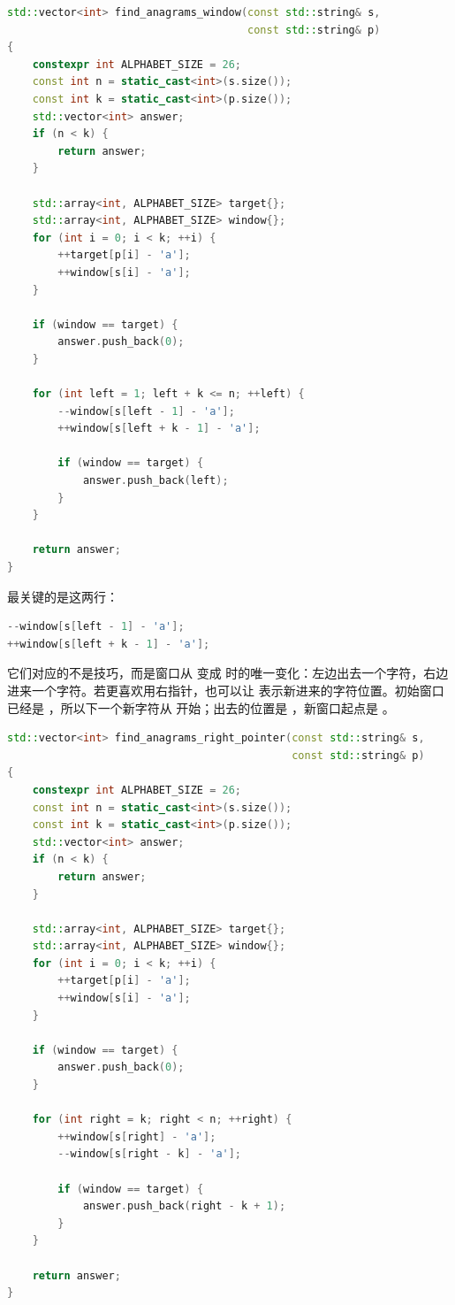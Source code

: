 \begin{lstlisting}[language=C++,caption={LeetCode 438 找到所有字母异位词：数组频次版}]
std::vector<int> find_anagrams_window(const std::string& s,
                                      const std::string& p)
{
    constexpr int ALPHABET_SIZE = 26;
    const int n = static_cast<int>(s.size());
    const int k = static_cast<int>(p.size());
    std::vector<int> answer;
    if (n < k) {
        return answer;
    }

    std::array<int, ALPHABET_SIZE> target{};
    std::array<int, ALPHABET_SIZE> window{};
    for (int i = 0; i < k; ++i) {
        ++target[p[i] - 'a'];
        ++window[s[i] - 'a'];
    }

    if (window == target) {
        answer.push_back(0);
    }

    for (int left = 1; left + k <= n; ++left) {
        --window[s[left - 1] - 'a'];
        ++window[s[left + k - 1] - 'a'];

        if (window == target) {
            answer.push_back(left);
        }
    }

    return answer;
}
\end{lstlisting}

最关键的是这两行：

\begin{lstlisting}[language=C++]
--window[s[left - 1] - 'a'];
++window[s[left + k - 1] - 'a'];
\end{lstlisting}

它们对应的不是技巧，而是窗口从  变成  时的唯一变化：左边出去一个字符，右边进来一个字符。若更喜欢用右指针，也可以让  表示新进来的字符位置。初始窗口已经是 ，所以下一个新字符从  开始；出去的位置是 ，新窗口起点是 。

\begin{lstlisting}[language=C++,caption={LeetCode 438：右指针写法}]
std::vector<int> find_anagrams_right_pointer(const std::string& s,
                                             const std::string& p)
{
    constexpr int ALPHABET_SIZE = 26;
    const int n = static_cast<int>(s.size());
    const int k = static_cast<int>(p.size());
    std::vector<int> answer;
    if (n < k) {
        return answer;
    }

    std::array<int, ALPHABET_SIZE> target{};
    std::array<int, ALPHABET_SIZE> window{};
    for (int i = 0; i < k; ++i) {
        ++target[p[i] - 'a'];
        ++window[s[i] - 'a'];
    }

    if (window == target) {
        answer.push_back(0);
    }

    for (int right = k; right < n; ++right) {
        ++window[s[right] - 'a'];
        --window[s[right - k] - 'a'];

        if (window == target) {
            answer.push_back(right - k + 1);
        }
    }

    return answer;
}
\end{lstlisting}

